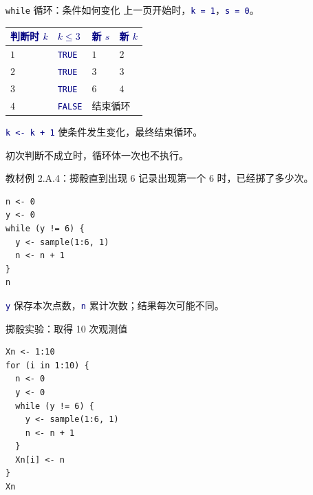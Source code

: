 \documentclass[14pt,compress,t,noamsthm,notheorem,table,handout,fontset=none]{ctexbeamer}
\newcommand{\code}[1]{\textcolor{navy}{\texttt{#1}}}
\newcommand{\inputlabel}{\par\smallskip{\fontsize{10.5}{13}\selectfont\bfseries\color{muted}输入代码\par}}
\newcommand{\thead}[1]{\textcolor{navy}{\textbf{#1}}}
\begin{document}
\begin{frame}{\texttt{while} 循环：条件如何变化}
  \small
  上一页开始时，\code{k = 1}，\code{s = 0}。
  \par\vspace{0.4em}
  \renewcommand{\arraystretch}{1.35}
  \begin{tabular*}{\linewidth}{@{\extracolsep{\fill}}llll@{}}
    \toprule
    \thead{判断时 $k$} & \thead{$k\leq 3$} & \thead{新 $s$} & \thead{新 $k$} \\
    \midrule
    $1$ & \code{TRUE} & $1$ & $2$ \\
    $2$ & \code{TRUE} & $3$ & $3$ \\
    $3$ & \code{TRUE} & $6$ & $4$ \\
    $4$ & \code{FALSE} & \multicolumn{2}{l}{结束循环} \\
    \bottomrule
  \end{tabular*}
  \par\vspace{0.5em}
  \code{k <- k + 1} 使条件发生变化，最终结束循环。
  \par\smallskip
  初次判断不成立时，循环体一次也不执行。
\end{frame}

\begin{frame}[fragile]{教材例 2.A.4：掷骰直到出现 6}
  \small
  记录出现第一个 6 时，已经掷了多少次。
  \inputlabel
\begin{lstlisting}
n <- 0
y <- 0
while (y != 6) {
  y <- sample(1:6, 1)
  n <- n + 1
}
n
\end{lstlisting}
  \small \code{y} 保存本次点数，\code{n} 累计次数；结果每次可能不同。
\end{frame}

\begin{frame}[fragile]{掷骰实验：取得 10 次观测值}
  \inputlabel
\begin{lstlisting}
Xn <- 1:10
for (i in 1:10) {
  n <- 0
  y <- 0
  while (y != 6) {
    y <- sample(1:6, 1)
    n <- n + 1
  }
  Xn[i] <- n
}
Xn
\end{lstlisting}
\end{frame}
\end{document}
